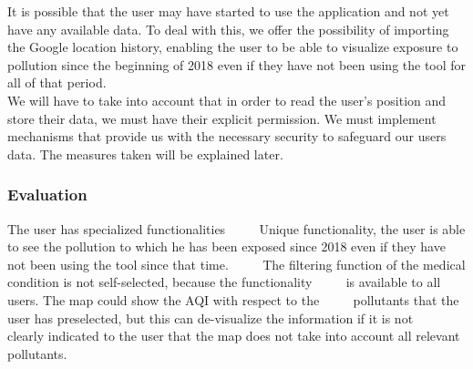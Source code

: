 It is possible that the user may have started to use the application and not yet have any available data.
To deal with this, we offer the possibility of importing the Google location history, enabling the user to be able to visualize
exposure to pollution since the beginning of 2018 even if they have not been using the tool for  all of that period.\\

We will have to take into account that in order to read the user's position and store their data, we must
have their explicit permission. We must implement mechanisms that provide us with the necessary security to safeguard our users data. The measures taken will be explained later.

\subsubsection*{Evaluation}

\begin{itemize}
  \done The user has specialized functionalities
     \done Unique functionality, the user is able to see the pollution to which he has been exposed since 2018 even if they have not been using the tool since that time.
     \crossed The filtering function of the medical condition is not self-selected, because the functionality
     is available to all users. The map could show the AQI with respect to the
     pollutants that the user has preselected, but this can de-visualize the information if it is not
     clearly indicated to the user that the map does not take into account all relevant pollutants.
\end{itemize}

